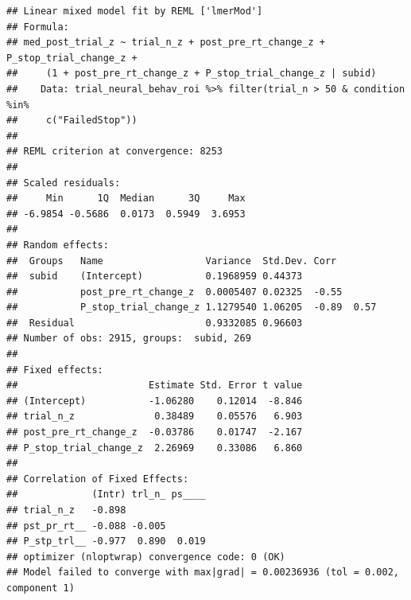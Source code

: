 \documentclass[
]{article}
\newenvironment{Shaded}{\begin{snugshade}}{\end{snugshade}}
\newcommand{\CommentTok}[1]{\textcolor[rgb]{0.56,0.35,0.01}{\textit{#1}}}
\newcommand{\DecValTok}[1]{\textcolor[rgb]{0.00,0.00,0.81}{#1}}
\newcommand{\KeywordTok}[1]{\textcolor[rgb]{0.13,0.29,0.53}{\textbf{#1}}}
\newcommand{\NormalTok}[1]{#1}
\newcommand{\OperatorTok}[1]{\textcolor[rgb]{0.81,0.36,0.00}{\textbf{#1}}}
\newcommand{\StringTok}[1]{\textcolor[rgb]{0.31,0.60,0.02}{#1}}
\begin{document}
\begin{verbatim}
## Linear mixed model fit by REML ['lmerMod']
## Formula: 
## med_post_trial_z ~ trial_n_z + post_pre_rt_change_z + P_stop_trial_change_z +  
##     (1 + post_pre_rt_change_z + P_stop_trial_change_z | subid)
##    Data: trial_neural_behav_roi %>% filter(trial_n > 50 & condition %in%  
##     c("FailedStop"))
## 
## REML criterion at convergence: 8253
## 
## Scaled residuals: 
##     Min      1Q  Median      3Q     Max 
## -6.9854 -0.5686  0.0173  0.5949  3.6953 
## 
## Random effects:
##  Groups   Name                  Variance  Std.Dev. Corr       
##  subid    (Intercept)           0.1968959 0.44373             
##           post_pre_rt_change_z  0.0005407 0.02325  -0.55      
##           P_stop_trial_change_z 1.1279540 1.06205  -0.89  0.57
##  Residual                       0.9332085 0.96603             
## Number of obs: 2915, groups:  subid, 269
## 
## Fixed effects:
##                       Estimate Std. Error t value
## (Intercept)           -1.06280    0.12014  -8.846
## trial_n_z              0.38489    0.05576   6.903
## post_pre_rt_change_z  -0.03786    0.01747  -2.167
## P_stop_trial_change_z  2.26969    0.33086   6.860
## 
## Correlation of Fixed Effects:
##             (Intr) trl_n_ ps____
## trial_n_z   -0.898              
## pst_pr_rt__ -0.088 -0.005       
## P_stp_trl__ -0.977  0.890  0.019
## optimizer (nloptwrap) convergence code: 0 (OK)
## Model failed to converge with max|grad| = 0.00236936 (tol = 0.002, component 1)
\end{verbatim}

\begin{Shaded}
\end{Shaded}
\end{document}

